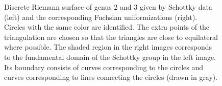 \documentclass[Thesis]{subfiles}
\begin{document}
\begin{figure}
  \centering
  \caption{Discrete Riemann surface of genus $2$ and $3$ given by Schottky
    data (left) and the corresponding Fuchsian uniformizations (right). Circles with
    the same color are identified. The extra points of the
    triangulation are chosen so that the triangles are close to
    equilateral where possible. The shaded region in the right images
    corresponds to the fundamental domain of the Schottky group in the
    left image. Its boundary consists of curves corresponding to the
    circles and curves corresponding to lines connecting the circles
    (drawn in gray).}
  \label{fig:schottky_g3}
\end{figure}


\end{document}
